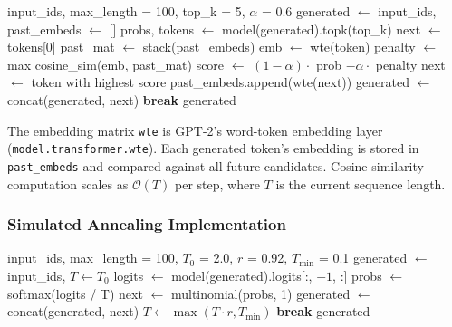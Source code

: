 \documentclass[12pt]{article}
\begin{document}
	\begin{algorithm}[H]
		\caption{Contrastive Search}
		\label{alg:contrastive}
		\begin{algorithmic}[1]
			\Require input\_ids, max\_length = 100, top\_k = 5, $\alpha$ = 0.6
			\State generated $\leftarrow$ input\_ids, past\_embeds $\leftarrow$ []
			\State probs, tokens $\leftarrow$ model(generated).topk(top\_k)
			\State next $\leftarrow$ tokens[0] 
			\Else
			\State past\_mat $\leftarrow$ stack(past\_embeds)
			\State emb $\leftarrow$ wte(token)
			\State penalty $\leftarrow$ max cosine\_sim(emb, past\_mat)
			\State score $\leftarrow$ $(1-\alpha) \cdot $ prob $- \alpha \cdot$ penalty
			\EndFor
			\State next $\leftarrow$ token with highest score
			\EndIf
			\State past\_embeds.append(wte(next))
			\State generated $\leftarrow$ concat(generated, next)
			 \textbf{break} \EndIf
			\EndWhile
			\Return generated
		\end{algorithmic}
	\end{algorithm}
	
	The embedding matrix \texttt{wte} is GPT-2's word-token embedding layer (\texttt{model.transformer.wte}). Each generated token's embedding is stored in \texttt{past\_embeds} and compared against all future candidates. Cosine similarity computation scales as $\mathcal{O}(T)$ per step, where $T$ is the current sequence length.
	
	\subsubsection{Simulated Annealing Implementation}
	
	\begin{algorithm}[H]
		\caption{Simulated Annealing Search}
		\label{alg:sa}
		\begin{algorithmic}[1]
			\Require input\_ids, max\_length = 100, $T_0$ = 2.0, $r$ = 0.92, $T_{\min}$ = 0.1
			\State generated $\leftarrow$ input\_ids, $T \leftarrow T_0$
			\State logits $\leftarrow$ model(generated).logits[:, $-1$, :]
			\State probs $\leftarrow$ softmax(logits / T)
			\State next $\leftarrow$ multinomial(probs, 1)
			\State generated $\leftarrow$ concat(generated, next)
			\State $T \leftarrow \max(T \cdot r, T_{\min})$ 
			 \textbf{break} \EndIf
			\EndWhile
			\Return generated
		\end{algorithmic}
	\end{algorithm}
	
\end{document}
